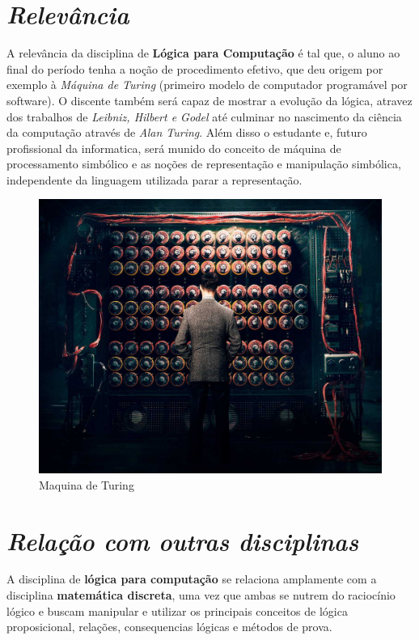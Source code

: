 \documentclass{article}
\begin{document}
\section{\emph{Relevância}}
A relevância da disciplina de \textbf{Lógica para Computação} é tal que, o aluno ao final do período tenha a noção de procedimento efetivo, que deu origem por exemplo à \emph{Máquina de Turing} (primeiro modelo de computador programável por software). O discente também será capaz de mostrar a evolução da lógica, atravez dos trabalhos de \emph{Leibniz, Hilbert e Godel} até culminar no nascimento da ciência da computação através de \emph{Alan Turing}. Além disso o estudante e, futuro profissional da informatica, será munido do conceito de máquina de processamento simbólico e as noções de representação e manipulação simbólica, independente da linguagem utilizada parar a representação.\cite{pgLogica}
\begin{figure}[h!]
    \centering
    \includegraphics[scale=0.13]{turing.jpg}
    \caption{Maquina de Turing\cite{imgTuring}}
    \label{fig:my_label}
\end{figure}
\section{\emph{Relação com outras disciplinas}}
A disciplina de \textbf{lógica para computação} se relaciona amplamente com a disciplina \textbf{matemática discreta}, uma vez que ambas se nutrem do raciocínio lógico e buscam manipular e utilizar os principais conceitos de lógica proposicional, relações, consequencias lógicas e métodos de prova.



\end{document}
